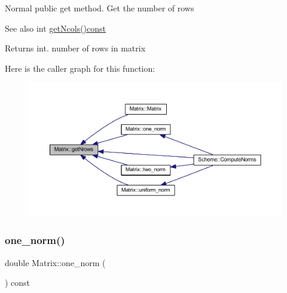 Normal public get method. Get the number of rows \begin{DoxySeeAlso}{See also}
int \mbox{\hyperlink{class_matrix_ae0a5f2154953b8d129a90b04f91d9079}{get\+Ncols()const}} 
\end{DoxySeeAlso}
\begin{DoxyReturn}{Returns}
int. number of rows in matrix 
\end{DoxyReturn}
Here is the caller graph for this function\+:
\nopagebreak
\begin{figure}[H]
\begin{center}
\leavevmode
\includegraphics[width=350pt]{class_matrix_a711f84a1c62832d9d197d78c9855a276_icgraph}
\end{center}
\end{figure}
\mbox{\label{class_matrix_af4d468252f3ecbbcaa5726c76e332b4c}} 
\subsubsection{\texorpdfstring{one\+\_\+norm()}{one\_norm()}}
{\footnotesize\ttfamily double Matrix\+::one\+\_\+norm (\begin{DoxyParamCaption}{ }\end{DoxyParamCaption}) const}

